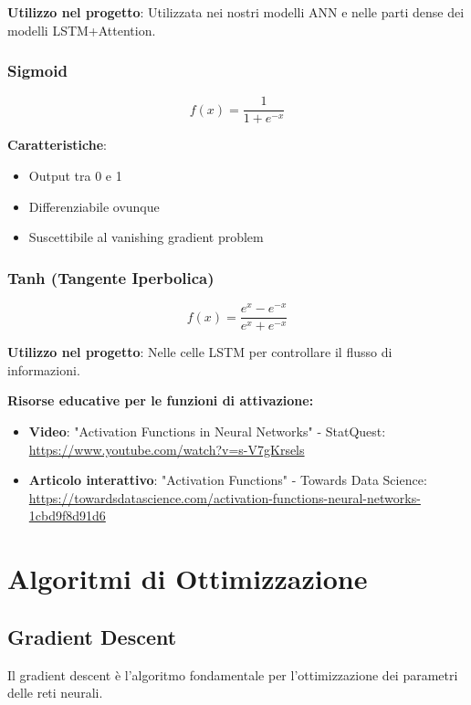 \documentclass[12pt,a4paper,twoside]{report}
\begin{document}
\textbf{Utilizzo nel progetto}: Utilizzata nei nostri modelli ANN e nelle parti dense dei modelli LSTM+Attention.

\subsubsection{Sigmoid}
\begin{equation}
f(x) = \frac{1}{1 + e^{-x}}
\end{equation}

\textbf{Caratteristiche}:
\begin{itemize}
    \item Output tra 0 e 1
    \item Differenziabile ovunque
    \item Suscettibile al vanishing gradient problem
\end{itemize}

\subsubsection{Tanh (Tangente Iperbolica)}
\begin{equation}
f(x) = \frac{e^x - e^{-x}}{e^x + e^{-x}}
\end{equation}

\textbf{Utilizzo nel progetto}: Nelle celle LSTM per controllare il flusso di informazioni.

\textbf{Risorse educative per le funzioni di attivazione:}
\begin{itemize}
    \item \textbf{Video}: "Activation Functions in Neural Networks" - StatQuest: \url{https://www.youtube.com/watch?v=s-V7gKrsels}
    \item \textbf{Articolo interattivo}: "Activation Functions" - Towards Data Science: \url{https://towardsdatascience.com/activation-functions-neural-networks-1cbd9f8d91d6}
\end{itemize}

\section{Algoritmi di Ottimizzazione}

\subsection{Gradient Descent}

Il gradient descent è l'algoritmo fondamentale per l'ottimizzazione dei parametri delle reti neurali.
\end{document}
